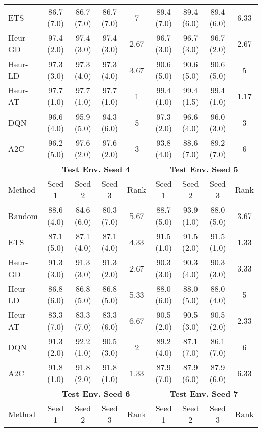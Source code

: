 \begin{table}[t]
{\begin{tabular}{lcccccccc}
ETS        & 86.7 (7.0)  & 86.7 (7.0)  & 86.7 (7.0) & 7    & 89.4 (7.0)  & 89.4 (6.0)  & 89.4 (6.0) & 6.33 \\
Heur-GD & 97.4 (2.0)  & 97.4 (3.0)  & 97.4 (3.0) & 2.67 & 96.7 (3.0)  & 96.7 (3.0)  & 96.7 (2.0) & 2.67 \\
Heur-LD & 97.3 (3.0)  & 97.3 (4.0)  & 97.3 (4.0) & 3.67 & 90.6 (5.0)  & 90.6 (5.0)  & 90.6 (5.0) & 5    \\
Heur-AT & 97.7 (1.0)  & 97.7 (1.0)  & 97.7 (1.0) & 1    & 99.4 (1.0)  & 99.4 (1.5)  & 99.4 (1.0) & 1.17 \\
DQN        & 96.6 (4.0)  & 95.9 (5.0)  & 94.3 (6.0) & 5    & 97.3 (2.0)  & 96.6 (4.0)  & 96.0 (3.0) & 3    \\
A2C        & 96.2 (5.0)  & 97.6 (2.0)  & 97.6 (2.0) & 3    & 93.8 (4.0)  & 88.6 (7.0)  & 89.2 (7.0) & 6    \\ \midrule
\textbf{}  & \multicolumn{4}{c}{\textbf{Test Env. Seed 4}} & \multicolumn{4}{c}{\textbf{Test Env. Seed 5}} \\
    \cmidrule(lr){2-5} \cmidrule(lr){6-9} 
Method     & Seed 1      & Seed 2      & Seed 3     & Rank & Seed 1      & Seed 2      & Seed 3     & Rank \\ \midrule
Random     & 88.6 (4.0)  & 84.6 (6.0)  & 80.3 (7.0) & 5.67 & 88.7 (5.0)  & 93.9 (1.0)  & 88.0 (5.0) & 3.67 \\
ETS        & 87.1 (5.0)  & 87.1 (4.0)  & 87.1 (4.0) & 4.33 & 91.5 (1.0)  & 91.5 (2.0)  & 91.5 (1.0) & 1.33 \\
Heur-GD & 91.3 (3.0)  & 91.3 (3.0)  & 91.3 (2.0) & 2.67 & 90.3 (3.0)  & 90.3 (4.0)  & 90.3 (3.0) & 3.33 \\
Heur-LD & 86.8 (6.0)  & 86.8 (5.0)  & 86.8 (5.0) & 5.33 & 88.0 (6.0)  & 88.0 (5.0)  & 88.0 (4.0) & 5    \\
Heur-AT & 83.3 (7.0)  & 83.3 (7.0)  & 83.3 (6.0) & 6.67 & 90.5 (2.0)  & 90.5 (3.0)  & 90.5 (2.0) & 2.33 \\
DQN        & 91.3 (2.0)  & 92.2 (1.0)  & 90.5 (3.0) & 2    & 89.2 (4.0)  & 87.1 (7.0)  & 86.1 (7.0) & 6    \\
A2C        & 91.8 (1.0)  & 91.8 (2.0)  & 91.8 (1.0) & 1.33 & 87.9 (7.0)  & 87.9 (6.0)  & 87.9 (6.0) & 6.33 \\ \midrule
\textbf{}  & \multicolumn{4}{c}{\textbf{Test Env. Seed 6}} & \multicolumn{4}{c}{\textbf{Test Env. Seed 7}} \\
    \cmidrule(lr){2-5} \cmidrule(lr){6-9} 
Method     & Seed 1      & Seed 2      & Seed 3     & Rank & Seed 1      & Seed 2      & Seed 3     & Rank \\ \midrule

\end{tabular}}
\end{table}
